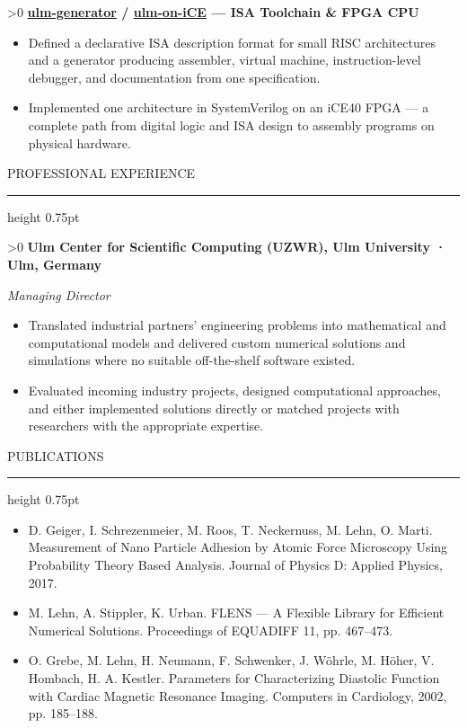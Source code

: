 \documentclass[10pt]{article}
\newcommand{\headsize}{\fontsize{10.5pt}{12.8pt}\selectfont}  %
\newcommand{\smallsize}{\fontsize{9.5pt}{11.6pt}\selectfont}  %
\newcommand{\looser}{\linespread{1.0417}\selectfont}
\newcommand{\cvsection}[1]{%
  \par\vspace{9pt}%
  {\headsize\bfseries\color{heading}\strut#1\par}%
  \nopagebreak\vspace{1pt}%
  {\color{rule}\hrule height 0.75pt}%
  \nopagebreak\vspace{3pt}%
  \prevdepth=2.7pt\relax %
}
\newcommand{\cventry}[3][0]{%
  \par\vspace{4.5pt}%
  \ifnum#1>0 \needspace{#1\baselineskip}\fi
  {\bfseries #2}\hspace{0pt plus 1filll}{\smallsize #3}\par
  \nopagebreak\vspace{1pt}%
}
\newcommand{\cvsubtitle}[1]{%
  {\smallsize\itshape #1\par}%
  \nopagebreak\vspace{1.5pt}%
}
\newenvironment{cvitems}
  {\begin{itemize}[label=•, leftmargin=15pt, labelwidth=10pt, labelsep=0pt,
                   align=left, topsep=0pt, partopsep=0pt, parsep=0pt,
                   itemsep=1.5pt, beginpenalty=10000]\looser}
  {\end{itemize}\vspace{1.5pt}}
\begin{document}
\cventry{\href{https://github.com/michael-lehn/ulm-generator}{ulm-generator} / \href{https://github.com/michael-lehn/ulm-on-ice}{ulm-on-iCE} — ISA Toolchain \& FPGA CPU}{C/C++ · SystemVerilog}
\begin{cvitems}
  \item Defined a declarative ISA description format for small RISC architectures and a generator producing assembler, virtual machine, instruction-level debugger, and documentation from one specification.
  \item Implemented one architecture in SystemVerilog on an iCE40 FPGA — a complete path from digital logic and ISA design to assembly programs on physical hardware.
\end{cvitems}

\cvsection{PROFESSIONAL EXPERIENCE}

\cventry{Ulm Center for Scientific Computing (UZWR), Ulm University · Ulm, Germany}{2006 – 2008}
\cvsubtitle{Managing Director}
\begin{cvitems}
  \item Translated industrial partners' engineering problems into mathematical and computational models and delivered custom numerical solutions and simulations where no suitable off-the-shelf software existed.
  \item Evaluated incoming industry projects, designed computational approaches, and either implemented solutions directly or matched projects with researchers with the appropriate expertise.
\end{cvitems}

\cvsection{PUBLICATIONS}

\begin{cvitems}
  \item D. Geiger, I. Schrezenmeier, M. Roos, T. Neckernuss, M. Lehn, O. Marti. Measurement of Nano Particle Adhesion by Atomic Force Microscopy Using Probability Theory Based Analysis. Journal of Physics D: Applied Physics, 2017.
  \item M. Lehn, A. Stippler, K. Urban. FLENS — A Flexible Library for Efficient Numerical Solutions. Proceedings of EQUADIFF 11, pp. 467–473.
  \item O. Grebe, M. Lehn, H. Neumann, F. Schwenker, J. Wöhrle, M. Höher, V. Hombach, H. A. Kestler. Parameters for Characterizing Diastolic Function with Cardiac Magnetic Resonance Imaging. Computers in Cardiology, 2002, pp. 185–188.
\end{cvitems}
\end{document}
